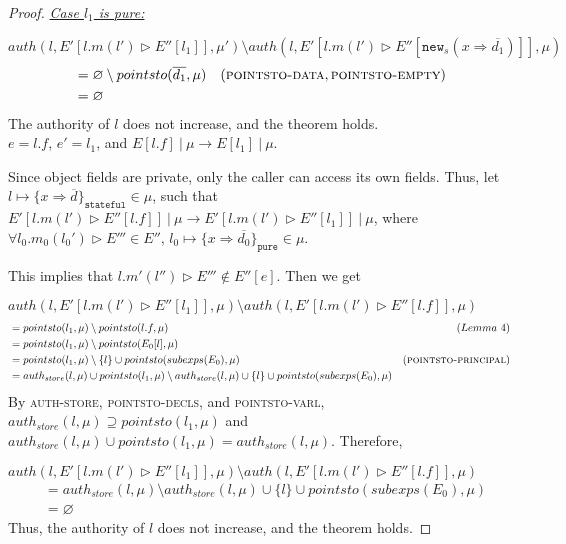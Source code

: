 \documentclass{llncs}
\newcommand{\keywadj}[1]{\mathtt{#1}}
\begin{document}
\begin{proof}
\noindent\underline{\textit{Case $l_1$ is pure:}}

\noindent$auth(l, E'[l.m(l') \rhd E''[l_1]], \mu') \setminus auth(l, E'[l.m(l') \rhd E''[\keywadj{new}_s(x \Rightarrow \overline{d_1})]], \mu)$
\vspace{-7pt}
\begin{align*}
&= \varnothing \setminus pointsto(\overline{d_1}, \mu) & (\textsc{pointsto-data}, \textsc{pointsto-empty})\\
&= \varnothing
\end{align*}
The authority of $l$ does not increase, and the theorem holds.\\


\noindent{}
$e = l.f$, $e' = l_1$, and $E[l.f]~|~\mu \longrightarrow E[l_1]~|~\mu$.

Since object fields are private, only the caller can access its own fields. Thus, let $l \mapsto \{ x \Rightarrow \overline{d} \}_{\keywadj{stateful}} \in \mu$, such that $E'[l.m(l') \rhd E''[l.f]]~|~\mu \longrightarrow E'[l.m(l') \rhd E''[l_1]]~|~\mu$, where $\forall l_0.m_0(l_0') \rhd E''' \in E''$, $l_0 \mapsto \{ x \Rightarrow \overline{d_0}\}_{\keywadj{pure}} \in \mu$.

This implies that $l.m'(l'') \rhd E''' \not\in E''[e]$. Then we get

\noindent$auth(l, E'[l.m(l') \rhd E''[l_1]], \mu) \setminus auth(l, E'[l.m(l') \rhd E''[l.f]], \mu)$
\vspace{-7pt}
\begin{align*}
&= pointsto(l_1, \mu) \setminus pointsto(l.f, \mu) & (Lemma~4)\\
&= pointsto(l_1, \mu) \setminus pointsto(E_0[l], \mu)\\
&= pointsto(l_1, \mu) \setminus \{ l \} \cup pointsto(subexps(E_0), \mu) & (\textsc{pointsto-principal})\\
&= auth_{store}(l, \mu) \cup pointsto(l_1, \mu) \setminus auth_{store}(l, \mu) \cup \{ l \} \cup pointsto(subexps(E_0), \mu)
\end{align*}
By \textsc{auth-store}, \textsc{pointsto-decls}, and \textsc{pointsto-varl}, $auth_{store}(l, \mu) \supseteq pointsto(l_1, \mu)$ and $auth_{store}(l, \mu) \cup pointsto(l_1, \mu) = auth_{store}(l, \mu)$. Therefore,

\noindent$auth(l, E'[l.m(l') \rhd E''[l_1]], \mu) \setminus auth(l, E'[l.m(l') \rhd E''[l.f]], \mu)$
\vspace{-7pt}
\begin{align*}
&= auth_{store}(l, \mu) \setminus auth_{store}(l, \mu) \cup \{ l \} \cup pointsto(subexps(E_0), \mu)\\
&= \varnothing
\end{align*}
Thus, the authority of $l$ does not increase, and the theorem holds.


\end{proof}
\end{document}
